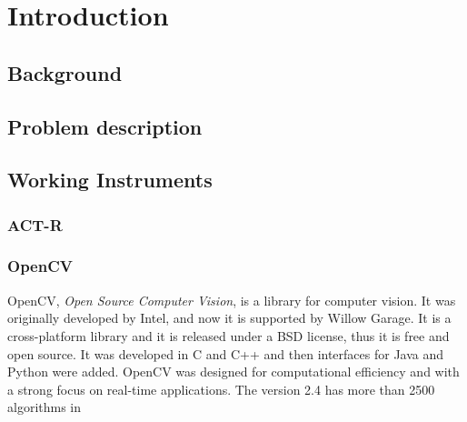 \chapter{Introduction}
\section{Background}
\section{Problem description}
\section{Working Instruments}
\subsection{ACT-R}
\subsection{OpenCV}
	OpenCV, \emph{Open Source Computer Vision}, is a library for computer vision. It was originally developed by Intel, and now it is supported by Willow Garage.
	It is a cross-platform library and it is released under a BSD license, thus it is free and open source. It was developed in C and C++ and then interfaces for Java and Python were added. OpenCV was designed for computational efficiency and with a strong focus on real-time applications. The version 2.4 has more than 2500 algorithms in 